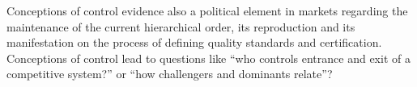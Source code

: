\documentclass[a4paper, 12pt, openright, oneside, german, french, brazil, english, article]{abntex2}
\begin{document}
	
	Conceptions of control evidence also a political element in markets regarding the maintenance of the current hierarchical order, its reproduction and its manifestation on the process of defining quality standards and certification. Conceptions of control lead to questions like ``who controls entrance and exit of a competitive system?'' or ``how challengers and dominants relate''?
	
	
	
	
\end{document}
